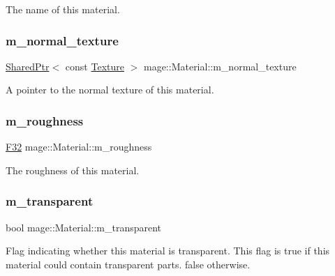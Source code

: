 The name of this material. \hypertarget{classmage_1_1_material_adc2d9d68524a55262bd0f4832880b10b}{}\label{classmage_1_1_material_adc2d9d68524a55262bd0f4832880b10b} 
\subsubsection{\texorpdfstring{m\+\_\+normal\+\_\+texture}{m\_normal\_texture}}
{\footnotesize\ttfamily \hyperlink{namespacemage_a1e01ae66713838a7a67d30e44c67703e}{Shared\+Ptr}$<$ const \hyperlink{classmage_1_1_texture}{Texture} $>$ mage\+::\+Material\+::m\+\_\+normal\+\_\+texture\hspace{0.3cm}{\ttfamily [private]}}

A pointer to the normal texture of this material. \hypertarget{classmage_1_1_material_a2a8a871ee6c18b68c33ce9cdfd23f15f}{}\label{classmage_1_1_material_a2a8a871ee6c18b68c33ce9cdfd23f15f} 
\subsubsection{\texorpdfstring{m\+\_\+roughness}{m\_roughness}}
{\footnotesize\ttfamily \hyperlink{namespacemage_aa97e833b45f06d60a0a9c4fc22ae02c0}{F32} mage\+::\+Material\+::m\+\_\+roughness\hspace{0.3cm}{\ttfamily [private]}}

The roughness of this material. \hypertarget{classmage_1_1_material_abaaf4666e33f4a7952ef9d0801e3f199}{}\label{classmage_1_1_material_abaaf4666e33f4a7952ef9d0801e3f199} 
\subsubsection{\texorpdfstring{m\+\_\+transparent}{m\_transparent}}
{\footnotesize\ttfamily bool mage\+::\+Material\+::m\+\_\+transparent\hspace{0.3cm}{\ttfamily [private]}}

Flag indicating whether this material is transparent. This flag is {\ttfamily true} if this material could contain transparent parts. {\ttfamily false} otherwise. 